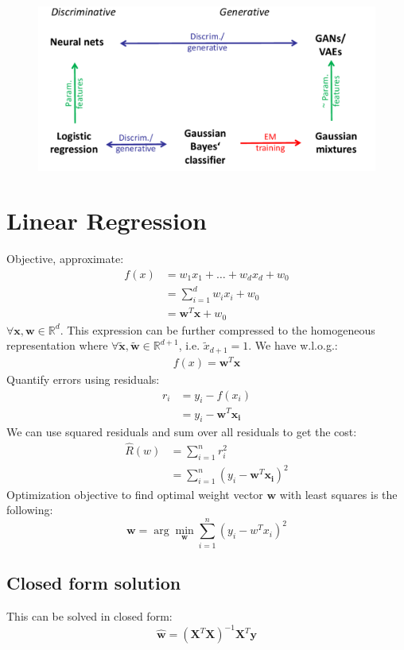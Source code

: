 \documentclass[a4paper,10pt,twoside]{article}
\begin{document}
\begin{figure}[H]
  \includegraphics[width=.8\textwidth]{figures/overview_4.png}
\end{figure}
\section{Linear Regression}
Objective, approximate:
\begin{align*}
    f(x) &= w_1x_1+\ldots+w_dx_d+w_0\\
        &= \sum_{i=1}^{d}w_ix_i+w_0\\
        &= \mathbf{w}^{T}\mathbf{x}+w_0
\end{align*}
$\forall \mathbf{x}, \mathbf{w}\in\mathbb{R}^{d}$. This expression can be further compressed to the homogeneous representation where $\forall \mathbf{\tilde{x}}, \mathbf{\tilde{w}}\in\mathbb{R}^{d+1}$, i.e. $\tilde{x}_{d+1}=1$. We have w.l.o.g.:
\begin{align*}
f(x) = \mathbf{w}^{T}\mathbf{x}
\end{align*}
Quantify errors using residuals:
\begin{align*}
    r_i &= y_i-f(x_i)\\
        &= y_i-\mathbf{w}^{T}\mathbf{x_i}
\end{align*}
We can use squared residuals and sum over all residuals to get the cost:
\begin{align}
    \label{objective_lse}
    \hat{R}(w) &= \sum_{i=1}^{n}r_i^2\\
               &= \sum_{i=1}^{n}(y_i-\mathbf{w}^{T}\mathbf{x_i})^2
\end{align}
Optimization objective to find optimal weight vector $\mathbf{w}$ with least squares is the following:
\begin{equation*}
    \mathbf{w} = \arg\min_{\mathbf{w}}\displaystyle\sum_{i=1}^{n}\left(y_i-w^{T}x_i\right)^2
\end{equation*}

\subsection{Closed form solution}
This can be solved in closed form:
\begin{equation*}
    \mathbf{\hat{w}} = (\mathbf{X}^{T}\mathbf{X})^{-1}\mathbf{X}^{T}\mathbf{y}
\end{equation*}
\end{document}
